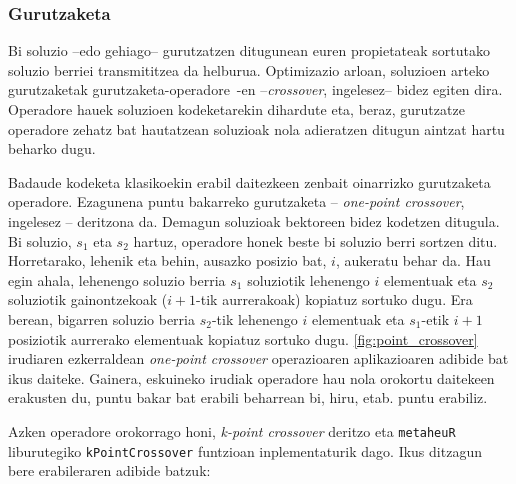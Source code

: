 \documentclass[eu]{ifirak}\usepackage[]{graphicx}\usepackage[]{color}
\newcommand{\zkk}{\guillemotleft}
\newcommand{\skk}{\guillemotright}
\newcommand{\code}[1]{\texttt{#1}}
\newcommand{\eng}[1]{\textit{#1}}
\newcommand{\hgl}[1]{\zkk #1\skk\ }
\begin{document}
\subsubsection{Gurutzaketa} 

Bi soluzio --edo gehiago-- gurutzatzen ditugunean euren propietateak sortutako soluzio berriei transmititzea da helburua. Optimizazio arloan, soluzioen arteko gurutzaketak \hgl{gurutzaketa-operadore}-en --\eng{crossover}, ingelesez-- bidez egiten dira. Operadore hauek soluzioen kodeketarekin dihardute eta, beraz, gurutzatze operadore zehatz bat hautatzean soluzioak nola adieratzen ditugun aintzat hartu beharko dugu. 

Badaude kodeketa klasikoekin erabil daitezkeen zenbait oinarrizko gurutzaketa operadore. Ezagunena puntu bakarreko gurutzaketa -- \eng{one-point crossover}, ingelesez -- deritzona da. Demagun soluzioak bektoreen bidez kodetzen ditugula. Bi soluzio, $s_1$ eta $s_2$ hartuz, operadore honek beste bi soluzio berri sortzen ditu. Horretarako, lehenik eta behin, ausazko posizio bat, $i$, aukeratu behar da. Hau egin ahala, lehenengo soluzio berria $s_1$ soluziotik lehenengo $i$ elementuak eta $s_2$ soluziotik gainontzekoak ($i+1$-tik aurrerakoak) kopiatuz sortuko dugu. Era berean, bigarren soluzio berria $s_2$-tik lehenengo $i$ elementuak eta $s_1$-etik $i+1$ posiziotik aurrerako elementuak kopiatuz sortuko dugu.  \ref{fig:point_crossover} irudiaren ezkerraldean \eng{one-point crossover} operazioaren aplikazioaren adibide bat ikus daiteke. Gainera, eskuineko irudiak operadore hau nola orokortu daitekeen erakusten du, puntu bakar bat erabili beharrean bi, hiru, etab. puntu erabiliz. 

Azken operadore orokorrago honi, \eng{k-point crossover} deritzo eta \code{metaheuR} liburutegiko \code{kPointCrossover} funtzioan inplementaturik dago. Ikus ditzagun bere erabileraren adibide batzuk:
\end{document}
